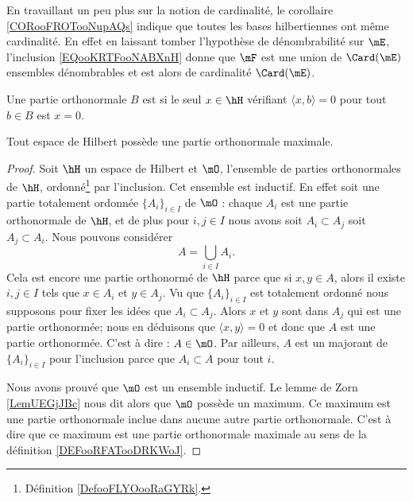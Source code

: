 \begin{remark}
    En travaillant un peu plus sur la notion de cardinalité, le corollaire \ref{CORooFROTooNupAQs} indique que toutes les bases hilbertiennes ont même cardinalité. En effet en laissant tomber l'hypothèse de dénombrabilité sur \( \mE\), l'inclusion \eqref{EQooKRTFooNABXnH} donne que \( \mF\) est une union de \( \Card(\mE)\) ensembles dénombrables et est alors de cardinalité \( \Card(\mE)\).
\end{remark}

\begin{definition}      \label{DEFooRFATooDRKWoJ}
    Une partie orthonormale \( B\) est  si le seul \( x\in \hH\) vérifiant \( \langle x, b\rangle =0\) pour tout \( b\in B\) est \( x=0\).
\end{definition}

\begin{lemma}\label{LEMooXIECooCAQeJN}
    Tout espace de Hilbert possède une partie orthonormale maximale.
\end{lemma}

\begin{proof}
    Soit \( \hH\) un espace de Hilbert et \( \mO\), l'ensemble de parties orthonormales de \( \hH\), ordonné\footnote{Définition \ref{DefooFLYOooRaGYRk}.} par l'inclusion. Cet ensemble est inductif. En effet soit une partie totalement ordonnée \( \{ A_i \}_{i\in I}\) de \( \mO\) : chaque \( A_i\) est une partie orthonormale de \( \hH\), et de plus pour \( i,j\in I\) nous avons soit \( A_i\subset A_j\) soit \( A_j\subset A_i\). Nous pouvons considérer
    \begin{equation}
        A=\bigcup_{i\in I}A_i.
    \end{equation}
    Cela est encore une partie orthonormé de \( \hH\) parce que si \( x,y\in A\), alors il existe \( i,j\in I\) tels que \( x\in A_i\) et \( y\in A_j\). Vu que \( \{ A_i \}_{i\in I}\) est totalement ordonné nous supposons pour fixer les idées que \( A_i\subset A_j\). Alors \(x \) et \( y\) sont dans \( A_j\) qui est une partie orthonormée; nous en déduisons que \( \langle x, y\rangle =0\) et donc que \( A\) est une partie orthonormée. C'est à dire : \( A\in \mO\). Par ailleurs, \( A\) est un majorant de \( \{ A_i \}_{i\in I}\) pour l'inclusion parce que \( A_i\subset A\) pour tout \( i\).

    Nous avons prouvé que \( \mO\) est un ensemble inductif. Le lemme de Zorn \ref{LemUEGjJBc} nous dit alors que \( \mO\) possède un maximum. Ce maximum est une partie orthonormale inclue dans aucune autre partie orthonormale. C'est à dire que ce maximum est une partie orthonormale maximale au sens de la définition \ref{DEFooRFATooDRKWoJ}.
\end{proof}

